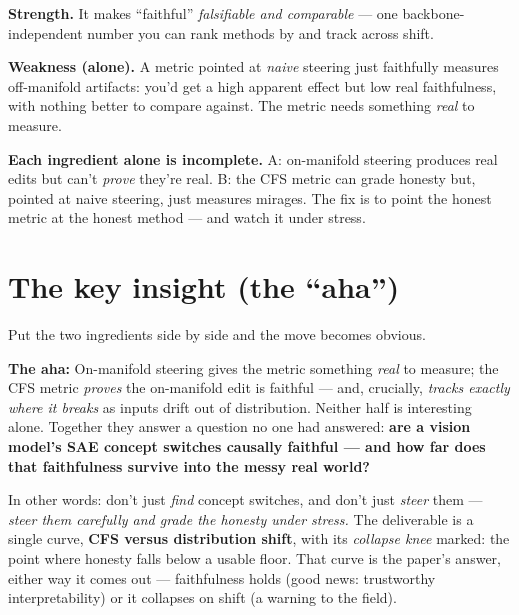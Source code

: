 \documentclass[12pt]{article}
\newcommand{\dlabel}[1]{\textbf{\textcolor{accent}{#1}}\;}
\begin{document}
\dlabel{Strength.} It makes ``faithful'' \emph{falsifiable and comparable} --- one backbone-independent number you can rank methods by and track across shift.

\dlabel{Weakness (alone).} A metric pointed at \emph{naive} steering just faithfully measures off-manifold artifacts: you'd get a high apparent effect but low real faithfulness, with nothing better to compare against. The metric needs something \emph{real} to measure.

\begin{keybox}
\textbf{Each ingredient alone is incomplete.}
A: on-manifold steering produces real edits but can't \emph{prove} they're real.\quad
B: the CFS metric can grade honesty but, pointed at naive steering, just measures mirages.
The fix is to point the honest metric at the honest method --- and watch it under stress.
\end{keybox}

\section{The key insight (the ``aha'')}

Put the two ingredients side by side and the move becomes obvious.

\begin{ahabox}
\textbf{The aha:} On-manifold steering gives the metric something \emph{real} to measure; the CFS metric \emph{proves} the on-manifold edit is faithful --- and, crucially, \emph{tracks exactly where it breaks} as inputs drift out of distribution. Neither half is interesting alone. Together they answer a question no one had answered: \textbf{are a vision model's SAE concept switches causally faithful --- and how far does that faithfulness survive into the messy real world?}
\end{ahabox}

In other words: don't just \emph{find} concept switches, and don't just \emph{steer} them --- \emph{steer them carefully and grade the honesty under stress.} The deliverable is a single curve, \textbf{CFS versus distribution shift}, with its \emph{collapse knee} marked: the point where honesty falls below a usable floor. That curve is the paper's answer, either way it comes out --- faithfulness holds (good news: trustworthy interpretability) or it collapses on shift (a warning to the field).
\end{document}
